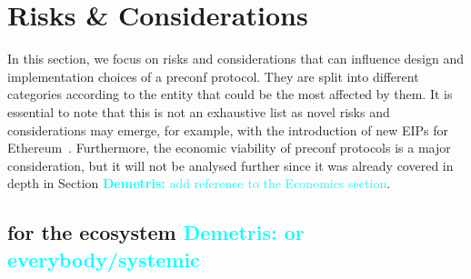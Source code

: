 \documentclass[a4paper]{article}
\theoremstyle{boldstyle}
\newcommand{\dk}[1]{\textcolor{cyan}{\textbf{Demetris:} #1}}
\begin{document}
    \section{Risks \& Considerations} %
    In this section, we focus on risks and considerations that can influence design and implementation choices of a preconf protocol. They are split into different categories according to the entity that could be the most affected by them. It is essential to note that this is not an exhaustive list as novel risks and considerations may emerge, for example, with the introduction of new EIPs for Ethereum~\cite{W:Future-ProofingPreconfirmations}. Furthermore, the economic viability of preconf protocols is a major consideration, but it will not be analysed further since it was already covered in depth in Section \dk{add reference to the Economics section}.

    \subsection{for the ecosystem \dk{or everybody/systemic}}
\end{document}
